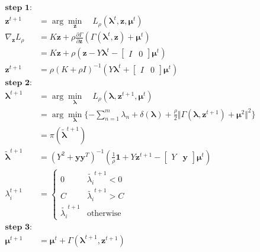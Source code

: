 \documentclass{article}
\begin{document}
\begin{align*}
    \textbf{step 1:}\\
        \mathbf{z}^{t+1}&
        =\arg\min\limits_\mathbf{z}\quad
        L_\rho(\boldsymbol{\lambda}^t,\mathbf{z},\boldsymbol{\mu}^t)\\
        \nabla_\mathbf{z}L_\rho
            &=K\mathbf{z}+\rho\frac{\partial\Gamma}{\partial\mathbf{z}}
            (\Gamma(\boldsymbol{\lambda}^t,\mathbf{z})+\boldsymbol{\mu}^t)\\
            &=K\mathbf{z}+\rho(\mathbf{z}-Y\boldsymbol{\lambda}^t-
                \begin{bmatrix}
                    I&0
                \end{bmatrix}
            \boldsymbol{\mu}^t)\\
        \mathbf{z}^{t+1}&=\rho(K+\rho I)^{-1}(Y\boldsymbol{\lambda}^t+
            \begin{bmatrix}
                I&0
            \end{bmatrix}
        \boldsymbol{\mu}^t)\\
    \textbf{step 2:}\\
        \boldsymbol{\lambda}^{t+1}&
        =\arg\min\limits_{\boldsymbol{\lambda}}\quad
        L_\rho(\boldsymbol{\lambda},\mathbf{z}^{t+1},\boldsymbol{\mu}^t)\\
        &=\arg\min\limits_{\boldsymbol{\lambda}}
        \{ -\sum\limits_{n=1}^m \lambda_n +
        \delta(\boldsymbol{\lambda}) +
        \frac{\rho}{2}\Vert \Gamma(\boldsymbol{\lambda},\mathbf{z}^{t+1})+\boldsymbol{\mu}^2 \Vert^2\}\\
        &=\pi(\tilde{\boldsymbol{\lambda}}^{t+1})\\
        \tilde{\boldsymbol{\lambda}}^{t+1}
        &=(Y^2+\mathbf{y}\mathbf{y}^T)^{-1}
        (\frac{1}{\rho}\mathbf{1}+Y\mathbf{z}^{t+1}-
            \begin{bmatrix}
                Y&\mathbf{y}
            \end{bmatrix}
        \boldsymbol{\mu}^t)\\
        \lambda_i^{t+1}&=
            \begin{cases}
                0&\tilde{\lambda_i}^{t+1}<0\\
                C&\tilde{\lambda_i}^{t+1}>C\\
                \tilde{\lambda_i}^{t+1}&\text{otherwise}
            \end{cases}\\
    \textbf{step 3:}\\
            \boldsymbol{\mu}^{t+1}&=\boldsymbol{\mu}^t +
            \Gamma(\boldsymbol{\lambda}^{t+1},\mathbf{z}^{t+1})
\end{align*}
\end{document}
